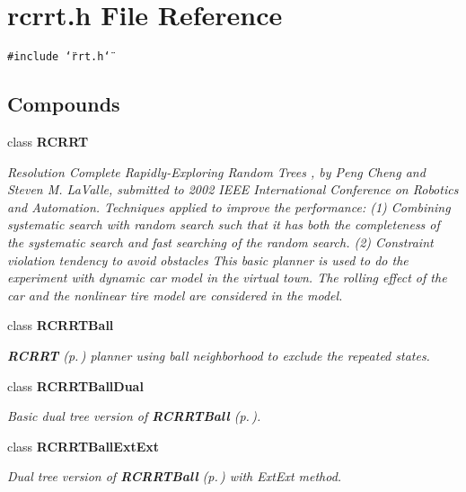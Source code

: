 \section{rcrrt.h File Reference}
\label{rcrrt_8h}
{\tt \#include \char`\"{}rrt.h\char`\"{}}\par
\subsection*{Compounds}
\begin{CompactItemize}
\item 
class {\bf RCRRT}
\begin{CompactList}\small\item\em Resolution Complete Rapidly-Exploring Random Trees , by Peng Cheng and Steven M. La\-Valle, submitted to 2002 IEEE International Conference on Robotics and Automation. Techniques applied to improve the performance: (1) Combining systematic search with random search such that it has both the completeness of the systematic search and fast searching of the random search. (2) Constraint violation tendency to avoid obstacles This basic planner is used to do the experiment with dynamic car model in the virtual town. The rolling effect of the car and the nonlinear tire model are considered in the model.\item\end{CompactList}\item 
class {\bf RCRRTBall}
\begin{CompactList}\small\item\em {\bf RCRRT} {\rm (p.\,\pageref{classRCRRT})} planner using ball neighborhood to exclude the repeated states.\item\end{CompactList}\item 
class {\bf RCRRTBall\-Dual}
\begin{CompactList}\small\item\em Basic dual tree version of {\bf RCRRTBall} {\rm (p.\,\pageref{classRCRRTBall})}.\item\end{CompactList}\item 
class {\bf RCRRTBall\-Ext\-Ext}
\begin{CompactList}\small\item\em Dual tree version of {\bf RCRRTBall} {\rm (p.\,\pageref{classRCRRTBall})} with Ext\-Ext method.\item\end{CompactList}\item 

\end{CompactItemize}
